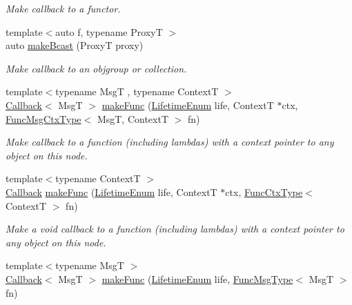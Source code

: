 \begin{DoxyCompactItemize}
\begin{DoxyCompactList}\small\item\em Make callback to a functor. \end{DoxyCompactList}\item 
{\footnotesize template$<$auto f, typename ProxyT $>$ }\\auto \hyperlink{structvt_1_1pipe_1_1_pipe_manager_a504f13120e6869619d2128208405fbc4}{make\+Bcast} (ProxyT proxy)
\begin{DoxyCompactList}\small\item\em Make callback to an objgroup or collection. \end{DoxyCompactList}\item 
{\footnotesize template$<$typename MsgT , typename ContextT $>$ }\\\hyperlink{namespacevt_a57b238783d05de96bc2c4027f7073b7f}{Callback}$<$ MsgT $>$ \hyperlink{structvt_1_1pipe_1_1_pipe_manager_a9ceec59c887d0fa1498b931c788962f6}{make\+Func} (\hyperlink{namespacevt_1_1pipe_acb42b284378c0fdac1d7c6335dc26f58}{Lifetime\+Enum} life, ContextT $\ast$ctx, \hyperlink{structvt_1_1pipe_1_1_pipe_manager_base_a73fdf82ece0411b3dc644c99b763f7a9}{Func\+Msg\+Ctx\+Type}$<$ MsgT, ContextT $>$ fn)
\begin{DoxyCompactList}\small\item\em Make callback to a function (including lambdas) with a context pointer to any object on this node. \end{DoxyCompactList}\item 
{\footnotesize template$<$typename ContextT $>$ }\\\hyperlink{namespacevt_a57b238783d05de96bc2c4027f7073b7f}{Callback} \hyperlink{structvt_1_1pipe_1_1_pipe_manager_a91ec013efbf41b818a2665436d5f0c4b}{make\+Func} (\hyperlink{namespacevt_1_1pipe_acb42b284378c0fdac1d7c6335dc26f58}{Lifetime\+Enum} life, ContextT $\ast$ctx, \hyperlink{structvt_1_1pipe_1_1_pipe_manager_base_ad8463823b6b4cfdb67c119d6d22e3bac}{Func\+Ctx\+Type}$<$ ContextT $>$ fn)
\begin{DoxyCompactList}\small\item\em Make a void callback to a function (including lambdas) with a context pointer to any object on this node. \end{DoxyCompactList}\item 
{\footnotesize template$<$typename MsgT $>$ }\\\hyperlink{namespacevt_a57b238783d05de96bc2c4027f7073b7f}{Callback}$<$ MsgT $>$ \hyperlink{structvt_1_1pipe_1_1_pipe_manager_a85a3af6f11eae0f41d95a5f66433c0e7}{make\+Func} (\hyperlink{namespacevt_1_1pipe_acb42b284378c0fdac1d7c6335dc26f58}{Lifetime\+Enum} life, \hyperlink{structvt_1_1pipe_1_1_pipe_manager_base_aa54eee64ab32a27777a672d49eb861f4}{Func\+Msg\+Type}$<$ MsgT $>$ fn)

\end{DoxyCompactItemize}
